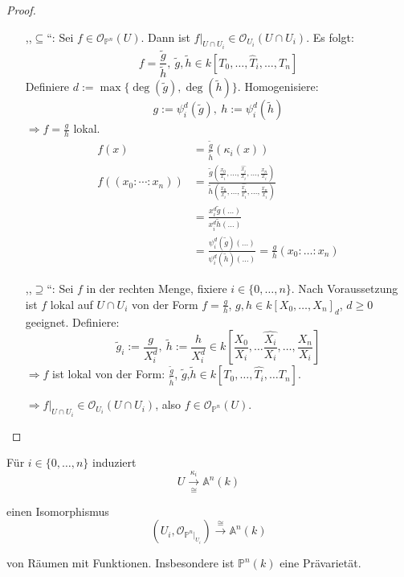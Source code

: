 \begin{proof}
  \mbox{}
  \begin{itemize}
  \item[,,$\subseteq$``:] Sei $f\in\mathcal{O}_{\mathbb{P}^{n}}(U)$. Dann ist $f|_{U\cap U_{i}}\in\mathcal{O}_{U_{i}}(U\cap U_{i})$.
    Es folgt:
    \[
      f=\frac{\tilde{g}}{\tilde{h}},\ \tilde{g},\tilde{h}\in k[T_{0},\ldots,\hat{T}_{i},\ldots,T_{n}]
    \]
    Definiere $d:=\max\{\deg(\tilde{g}),\deg(\tilde{h})\}$. Homogenisiere:
    \[
      g:=\psi_{i}^{d}(\tilde{g}),\ h:=\psi_{i}^{d}(\tilde{h})
    \]
    $\Rightarrow f=\frac{g}{h}$ lokal. 
    \begin{align*}
      f(x) & =\frac{\tilde{g}}{\tilde{h}}(\kappa_{i}(x))\\
      f((x_{0}:\cdots:x_{n})) & =\frac{\tilde{g}\left(\frac{x_{0}}{x_{i}},\ldots,\frac{\hat{x_{i}}}{x_{i}},\ldots,\frac{x_{n}}{x_{i}}\right)}{\tilde{h}\left(\frac{x_{0}}{x_{i}},\ldots,\frac{\hat{x_{i}}}{x_{i}},\ldots,\frac{x_{n}}{x_{i}}\right)}\\
           & =\frac{x_{i}^{d}\tilde{g}(\ldots)}{x_{i}^{d}\tilde{h}(\ldots)}\\
           & =\frac{\psi_{i}^{d}(\tilde{g})(\ldots)}{\psi_{i}^{d}(\tilde{h})(\ldots)}=\frac{g}{h}(x_{0}:\ldots:x_{n})
    \end{align*}
  \item[,,$\supseteq$``:] Sei $f$ in der rechten Menge, fixiere $i\in\{0,\ldots,n\}$. Nach Voraussetzung ist $f$ lokal
    auf $U\cap U_{i}$ von der Form $f = \frac{g}{h}$, $g,h\in k[X_{0},\ldots,X_{n}]_{d}$, $d\geq 0$ geeignet. Definiere:
    \[
      \tilde{g}_{i}:=\frac{g}{X_{i}^{d}},\ \tilde{h}:=\frac{h}{X_{i}^{d}}\in k\left[\frac{X_{0}}{X_{i}},\ldots\hat{\frac{X_{i}}{X_{i}}},\ldots,\frac{X_{n}}{X_{i}}\right]
    \]
    $\Rightarrow f$ ist lokal von der Form: $\frac{\tilde{g}}{\tilde{h}}$,
    $\tilde{g}$,$\tilde{h}\in k[T_{0},\ldots,\hat{T_{i}},\ldots T_{n}]$.

    $\Rightarrow f|_{U\cap U_{i}}\in\mathcal{O}_{U_{i}}(U\cap U_{i})$, also $f \in \mathcal{O}_{\mathbb{P}^{n}}(U)$.

  \end{itemize}
\end{proof}
\begin{cor}[orig. 52]
  \label{cor:affine-ueberdeckung-des-projektiven-raumes}
  Für $i\in\{0,\ldots,n\}$ induziert
  \[
    U\xrightarrow[\cong]{\kappa_{i}}\mathbb{A}^{n}(k)
  \]

  einen Isomorphismus
  \[
    (U_{i},\mathcal{O}_{\mathbb{P}^{n}|_{U_{i}}})\xrightarrow{\cong}\mathbb{A}^{n}(k)
  \]

  von Räumen mit Funktionen. Insbesondere ist $\mathbb{P}^{n}(k)$ eine
  Prävarietät.
\end{cor}
